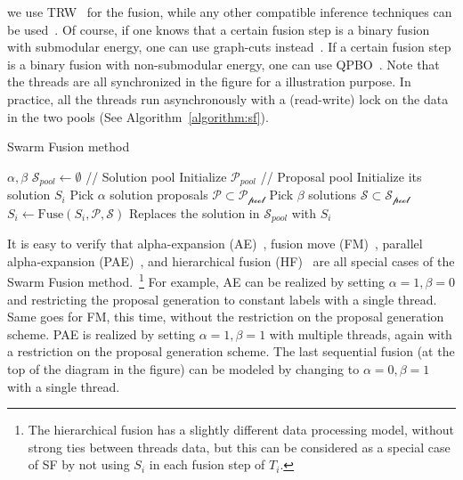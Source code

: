 we use TRW~\cite{kolmogorov} for the fusion, while any other compatible
inference techniques can be used~\cite{opengm}. Of course, if one knows
that a certain fusion step is a binary fusion with submodular energy,
one can use graph-cuts instead~\cite{alpha_expansion_paper}. If a
certain fusion step is a binary fusion with non-submodular energy, one
can use QPBO~\cite{second_order_smoothness_stereo}.
%
Note that the threads are all synchronized in the figure for a
illustration purpose. In practice, all the threads run asynchronously
with a (read-write) lock on the data in the two pools (See Algorithm~\ref{algorithm:sf}).
%
%
%
\begin{algorithm}
 \caption{Swarm Fusion method}
 \label{algorithm:sf}
 \begin{algorithmic}
  \Procedure{} {$\alpha, \beta$}
  \State $\mathcal{S}_{pool} \leftarrow \emptyset$ //
  Solution pool
  \State Initialize $\mathcal{P}_{pool}$ // Proposal pool
  \State Initialize its solution $S_i$
  \EndFor
  \State
  \State Pick $\alpha$ solution proposals $\mathcal{P}\subset \mathcal{P_{\mbox{pool}}}$
  \State Pick $\beta$ solutions $\mathcal{S} \subset \mathcal{S_{\mbox{pool}}}$
  \State $S_i \leftarrow \mbox{Fuse}(S_i, \mathcal{P}, \mathcal{S})$
  \State Replaces the solution in $\mathcal{S}_{pool}$ with $S_i$
  \EndFor
  \EndProcedure
 \end{algorithmic}
\end{algorithm}



\noindent It is easy to verify that alpha-expansion
(AE)~\cite{alpha_expansion}, fusion move (FM)~\cite{viktor}, parallel
alpha-expansion (PAE)~\cite{delong}, and hierarchical fusion
(HF)~\cite{delong_hierarchical,olga} are all special cases of the Swarm
Fusion method.~\footnote{The hierarchical fusion has a slightly
different data processing model, without strong ties between threads
data, but this can be considered as a special case of SF by not using
$S_i$ in each fusion step of $T_i$.} For example, AE can be realized by
setting $\alpha=1, \beta=0$ and restricting the proposal generation to
constant labels with a single thread. Same goes for FM, this time,
without the restriction on the proposal generation scheme. PAE is
realized by setting $\alpha=1,\beta=1$ with multiple threads, again with
a restriction on the proposal generation scheme. The last sequential
fusion (at the top of the diagram in the figure) can be modeled by
changing to $\alpha=0, \beta=1$ with a single thread.


